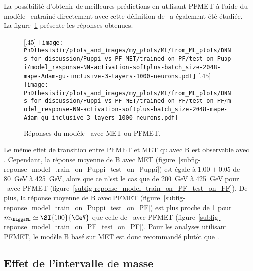 \par
La possibilité d'obtenir de meilleures prédictions en utilisant PFMET à l'aide du modèle \Bpf\ entraîné directement avec cette définition de \MET\ a également été étudiée.
La figure~\ref{fig-MET-PF-PUPPI-Bpf} présente les réponses obtenues.
\begin{figure}[h]
\centering

[.45\textwidth]
{\texttt{[image: \\PhDthesisdir/plots\_and\_images/my\_plots/ML/from\_ML\_plots/DNNs\_for\_discussion/Puppi\_vs\_PF\_MET/trained\_on\_PF/test\_on\_Puppi/model\_response-NN-activation-softplus-batch\_size-2048-mape-Adam-gu-inclusive-3-layers-1000-neurons.pdf]}\vspace{-.5\baselineskip}}
\hfill
{}[.45\textwidth]
{\texttt{[image: \\PhDthesisdir/plots\_and\_images/my\_plots/ML/from\_ML\_plots/DNNs\_for\_discussion/Puppi\_vs\_PF\_MET/trained\_on\_PF/test\_on\_PF/model\_response-NN-activation-softplus-batch\_size-2048-mape-Adam-gu-inclusive-3-layers-1000-neurons.pdf]}\vspace{-.5\baselineskip}}

\caption{Réponses du modèle \Bpf\ avec \PUPPI MET ou PFMET.}
\label{fig-MET-PF-PUPPI-Bpf}
\end{figure}
\par
Le même effet de transition entre PFMET et \PUPPI MET qu'avec B est observable avec \Bpf.
Cependant,
la réponse moyenne de B avec \PUPPI MET (figure~\ref{subfig-reponse_model_train_on_Puppi_test_on_Puppi})
est égale à $\num{1.00}\pm\num{0.05}$ de \SI{80}{\GeV} à \SI{425}{\GeV},
alors que ce n'est le cas que de \SI{200}{\GeV} à \SI{425}{\GeV}
pour \Bpf\ avec PFMET (figure~\ref{subfig-reponse_model_train_on_PF_test_on_PF}).
De plus, la réponse moyenne de B avec PFMET (figure~\ref{subfig-reponse_model_train_on_Puppi_test_on_PF})
est plus proche de 1 pour $m_{\higgsML}\simeq\SI{100}{\GeV}$
que celle de \Bpf\ avec PFMET (figure~\ref{subfig-reponse_model_train_on_PF_test_on_PF}).
Pour les analyses utilisant PFMET,
le modèle B basé sur \PUPPI MET est donc recommandé plutôt que \Bpf.
\subsection{Effet de l'intervalle de masse}
